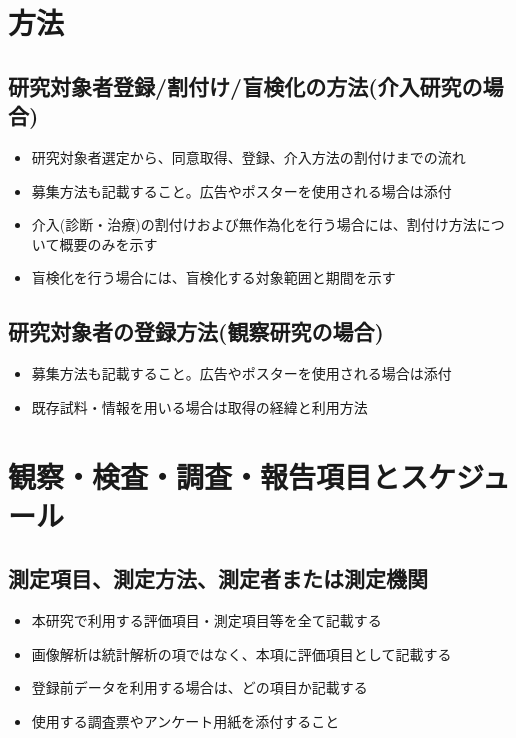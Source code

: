 \documentclass{kyodai-protocol}
\begin{document}
\section{方法}

\subsection{研究対象者登録/割付け/盲検化の方法(介入研究の場合)}
\begin{itemize}
\item 研究対象者選定から、同意取得、登録、介入方法の割付けまでの流れ
\item 募集方法も記載すること。広告やポスターを使用される場合は添付
\item 介入(診断・治療)の割付けおよび無作為化を行う場合には、割付け方法について概要のみを示す
\item 盲検化を行う場合には、盲検化する対象範囲と期間を示す
\end{itemize}

\subsection{研究対象者の登録方法(観察研究の場合)}
\begin{itemize}
\item 募集方法も記載すること。広告やポスターを使用される場合は添付
\item 既存試料・情報を用いる場合は取得の経緯と利用方法
\end{itemize}

\section{観察・検査・調査・報告項目とスケジュール}

\subsection{測定項目、測定方法、測定者または測定機関}
\begin{itemize}
\item 本研究で利用する評価項目・測定項目等を全て記載する
\item 画像解析は統計解析の項ではなく、本項に評価項目として記載する
\item 登録前データを利用する場合は、どの項目か記載する
\item 使用する調査票やアンケート用紙を添付すること
\end{itemize}
\end{document}
